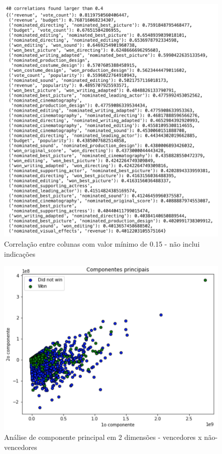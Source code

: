             \begin{figure}[htb]
            	\caption{\label{corrs0.15}Correlação entre colunas com valor mínimo de 0.15 - não inclui indicações}
            	\begin{center}
            		\includegraphics[scale=0.7]{corrs0.4.png}
            	\end{center}
            \end{figure}
            
            \begin{figure}[htb]
            	\caption{\label{pca_2}Análise de componente principal em 2 dimensões - vencedores x não-vencedores}
            	\begin{center}
            		\includegraphics[scale=0.7]{pca_2.png}
            	\end{center}
            \end{figure}
            
